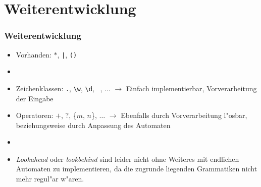 \documentclass[ignorenonframetext]{beamer}
\begin{document}
\section{Weiterentwicklung}
\begin{frame}
    \frametitle{Weiterentwicklung}

    \begin{itemize}
        \item Vorhanden: $*$, \texttt{|}, \texttt{()}
        \item[]
        \item Zeichenklassen: \texttt{.}, \texttt{\textbackslash w}, \texttt{\textbackslash d},  \lbrack\ \rbrack, $\hdots$ $\rightarrow$ Einfach implementierbar, Vorverarbeitung der Eingabe
        \item Operatoren: $+$, ?, \{$m$, $n$\}, $\hdots$ $\rightarrow$ Ebenfalls durch Vorverarbeitung l"osbar, beziehungsweise durch Anpassung des Automaten
        \item[]
        \item \textit{Lookahead} oder \textit{lookbehind} sind leider nicht ohne Weiteres mit endlichen Automaten zu implementieren, da die zugrunde liegenden Grammatiken nicht mehr regul"ar w"aren.
    \end{itemize}
\end{frame}
\end{document}
